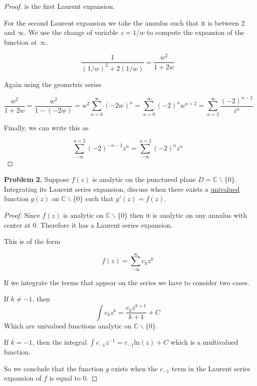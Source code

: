 \documentclass[letterpaper,twoside,11pt]{article}
\begin{document}
\begin{proof}
is the first Laurent expansion.

For the second Laurent expansion we take the annulus such that it is between 2 and $\infty$. We use the change of variable $z=1/w$ to compute the expansion of the function at $\infty$.

\begin{equation}
\frac{1}{(1/w)^2+2(1/w)}= \frac{w^2}{1+2w}\nonumber
\end{equation}

Again using the geometric series

\begin{equation}
\frac{w^2}{1+2w}=\frac{w^2}{1-(-2w)}=w^2\sum_{n=0}^{\infty}(-2w)^n=\sum_{n=0}^{\infty}(-2)^nw^{n+2}= \sum_{n=2}^{\infty}\frac{(-2)^{n-2}}{z^{n}}\nonumber
\end{equation}

Finally, we can write this as

\begin{equation}
\sum_{-\infty}^{n=2}(-2)^{-n-2}z^{n}=\sum_{-\infty}^{n=2}(-2)^{n}z^{n} \nonumber
\end{equation}
\end{proof}

\newpage
\textbf{Problem 2.} Suppose $f(z)$ is analytic on the punctured plane $D = \mathbb{C}\backslash\{0\}$. Integrating its Laurent series expansion, discuss when there exists a \underline{univalued} function $g(z)$ on $\mathbb{C}\backslash\{0\}$ such
that $g'(z) = f(z)$.

\begin{proof}
Since $f(z)$ is analytic on $\mathbb{C}\backslash\{0\}$ then it is analytic on any annulus with center at 0. Therefore it has a Laurent series expansion.

This is of the form

\begin{equation}
f(z)=\sum_{-\infty}^{\infty}c_kz^k \nonumber
\end{equation}

If we integrate the terms that appear on the series we have to consider two cases.

If $k\not = -1$, then 
\begin{equation}
\int c_kz^k = \frac{c_kz^{k+1}}{k+1} + C\nonumber
\end{equation}
Which are univalued functions analytic on $\mathbb{C}\backslash\{0\}$.

If $k=-1$, then the integral $\int c_{-1}z^{-1} = c_{-1}\text{ln}(z)+ C$ which is a multivalued function.

So we conclude that the function $g$ exists when the $c_{-1}$ term in the Laurent series expansion of $f$ is equal to 0.
\end{proof}
\newpage
\end{document}
